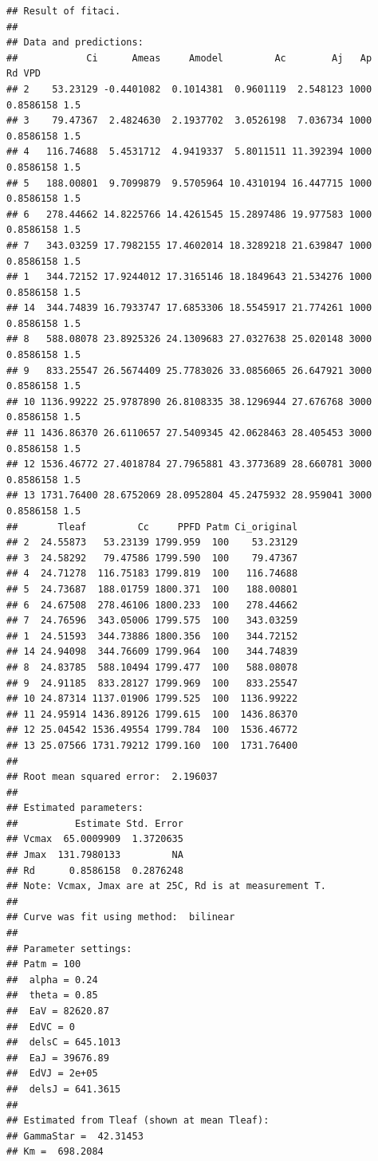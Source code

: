 \documentclass[
]{krantz}
\begin{document}
\begin{verbatim}
## Result of fitaci.
## 
## Data and predictions:
##            Ci      Ameas     Amodel         Ac        Aj   Ap        Rd VPD
## 2    53.23129 -0.4401082  0.1014381  0.9601119  2.548123 1000 0.8586158 1.5
## 3    79.47367  2.4824630  2.1937702  3.0526198  7.036734 1000 0.8586158 1.5
## 4   116.74688  5.4531712  4.9419337  5.8011511 11.392394 1000 0.8586158 1.5
## 5   188.00801  9.7099879  9.5705964 10.4310194 16.447715 1000 0.8586158 1.5
## 6   278.44662 14.8225766 14.4261545 15.2897486 19.977583 1000 0.8586158 1.5
## 7   343.03259 17.7982155 17.4602014 18.3289218 21.639847 1000 0.8586158 1.5
## 1   344.72152 17.9244012 17.3165146 18.1849643 21.534276 1000 0.8586158 1.5
## 14  344.74839 16.7933747 17.6853306 18.5545917 21.774261 1000 0.8586158 1.5
## 8   588.08078 23.8925326 24.1309683 27.0327638 25.020148 3000 0.8586158 1.5
## 9   833.25547 26.5674409 25.7783026 33.0856065 26.647921 3000 0.8586158 1.5
## 10 1136.99222 25.9787890 26.8108335 38.1296944 27.676768 3000 0.8586158 1.5
## 11 1436.86370 26.6110657 27.5409345 42.0628463 28.405453 3000 0.8586158 1.5
## 12 1536.46772 27.4018784 27.7965881 43.3773689 28.660781 3000 0.8586158 1.5
## 13 1731.76400 28.6752069 28.0952804 45.2475932 28.959041 3000 0.8586158 1.5
##       Tleaf         Cc     PPFD Patm Ci_original
## 2  24.55873   53.23139 1799.959  100    53.23129
## 3  24.58292   79.47586 1799.590  100    79.47367
## 4  24.71278  116.75183 1799.819  100   116.74688
## 5  24.73687  188.01759 1800.371  100   188.00801
## 6  24.67508  278.46106 1800.233  100   278.44662
## 7  24.76596  343.05006 1799.575  100   343.03259
## 1  24.51593  344.73886 1800.356  100   344.72152
## 14 24.94098  344.76609 1799.964  100   344.74839
## 8  24.83785  588.10494 1799.477  100   588.08078
## 9  24.91185  833.28127 1799.969  100   833.25547
## 10 24.87314 1137.01906 1799.525  100  1136.99222
## 11 24.95914 1436.89126 1799.615  100  1436.86370
## 12 25.04542 1536.49554 1799.784  100  1536.46772
## 13 25.07566 1731.79212 1799.160  100  1731.76400
## 
## Root mean squared error:  2.196037 
## 
## Estimated parameters:
##          Estimate Std. Error
## Vcmax  65.0009909  1.3720635
## Jmax  131.7980133         NA
## Rd      0.8586158  0.2876248
## Note: Vcmax, Jmax are at 25C, Rd is at measurement T.
## 
## Curve was fit using method:  bilinear 
## 
## Parameter settings:
## Patm = 100
##  alpha = 0.24
##  theta = 0.85
##  EaV = 82620.87
##  EdVC = 0
##  delsC = 645.1013
##  EaJ = 39676.89
##  EdVJ = 2e+05
##  delsJ = 641.3615
## 
## Estimated from Tleaf (shown at mean Tleaf):
## GammaStar =  42.31453 
## Km =  698.2084
\end{verbatim}
\end{document}
